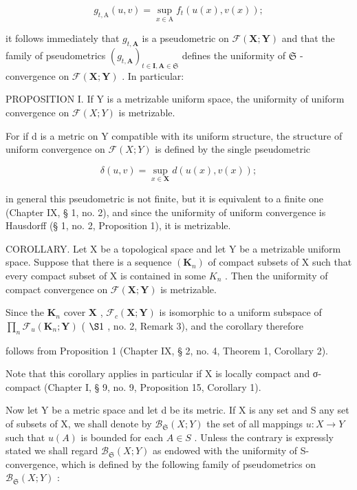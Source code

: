 \[
g _ {t, \mathrm{A}} (u, v) = \sup _ {x \in \mathrm{A}} f _ {t} (u (x), v (x));
\]

it follows immediately that \(g_{t,\mathbf{A}}\) is a pseudometric on \(\mathcal{F}(\mathbf{X};\mathbf{Y})\) and that the family of pseudometrics \((g_{t,\mathbf{A}})_{t\in \mathbf{I},\mathbf{A}\in \mathfrak{S}}\) defines the uniformity of \(\mathfrak{S}\) -convergence on \(\mathcal{F}(\mathbf{X};\mathbf{Y})\) . In particular:

PROPOSITION I. If Y is a metrizable uniform space, the uniformity of uniform convergence on \(\mathcal{F}(X;Y)\) is metrizable.

For if d is a metric on Y compatible with its uniform structure, the structure of uniform convergence on \(\mathcal{F}(X;Y)\) is defined by the single pseudometric

\[
\delta (u, v) = \sup _ {x \in \mathbf {X}} d (u (x), v (x));
\]

in general this pseudometric is not finite, but it is equivalent to a finite one (Chapter IX, § 1, no. 2), and since the uniformity of uniform convergence is Hausdorff (§ 1, no. 2, Proposition 1), it is metrizable.

COROLLARY. Let X be a topological space and let Y be a metrizable uniform space. Suppose that there is a sequence \((\mathbf{K}_{n})\) of compact subsets of X such that every compact subset of X is contained in some \(K_{n}\) . Then the uniformity of compact convergence on \(\mathcal{F}(\mathbf{X};\mathbf{Y})\) is metrizable.

Since the \(\mathbf{K}_n\) cover \(\mathbf{X}\) , \(\mathcal{F}_c(\mathbf{X};\mathbf{Y})\) is isomorphic to a uniform subspace of \(\prod_{n}\mathcal{F}_{u}(\mathbf{K}_{n};\mathbf{Y})\) ( \(\S 1\) , no. 2, Remark 3), and the corollary therefore

follows from Proposition 1 (Chapter IX, § 2, no. 4, Theorem 1, Corollary 2).

Note that this corollary applies in particular if X is locally compact and σ-compact (Chapter I, § 9, no. 9, Proposition 15, Corollary 1).

Now let Y be a metric space and let d be its metric. If X is any set and S any set of subsets of X, we shall denote by \(\mathcal{B}_{\mathfrak{S}}(X;Y)\) the set of all mappings \(u:X\to Y\) such that \(u(A)\) is bounded for each \(A\in S\) . Unless the contrary is expressly stated we shall regard \(\mathcal{B}_{\mathfrak{S}}(X;Y)\) as endowed with the uniformity of S-convergence, which is defined by the following family of pseudometrics on \(\mathcal{B}_{\mathfrak{S}}(X;Y)\) :

